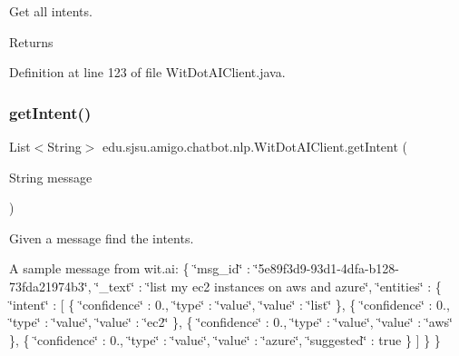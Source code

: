 Get all intents.

\begin{DoxyReturn}{Returns}

\end{DoxyReturn}


Definition at line 123 of file Wit\+Dot\+A\+I\+Client.\+java.

\mbox{\label{classedu_1_1sjsu_1_1amigo_1_1chatbot_1_1nlp_1_1_wit_dot_a_i_client_aa0e6e4f924089e29165ec44f7b7f54ee}} 
\subsubsection{\texorpdfstring{get\+Intent()}{getIntent()}}
{\footnotesize\ttfamily List$<$String$>$ edu.\+sjsu.\+amigo.\+chatbot.\+nlp.\+Wit\+Dot\+A\+I\+Client.\+get\+Intent (\begin{DoxyParamCaption}\item[{String}]{message }\end{DoxyParamCaption})}

Given a message find the intents.

A sample message from wit.\+ai\+: \{ \char`\"{}msg\+\_\+id\char`\"{} \+: \char`\"{}5e89f3d9-\/93d1-\/4dfa-\/b128-\/73fda21974b3\char`\"{}, \char`\"{}\+\_\+text\char`\"{} \+: \char`\"{}list my ec2 instances on aws and azure\char`\"{}, \char`\"{}entities\char`\"{} \+: \{ \char`\"{}intent\char`\"{} \+: \mbox{[} \{ \char`\"{}confidence\char`\"{} \+: 0., \char`\"{}type\char`\"{} \+: \char`\"{}value\char`\"{}, \char`\"{}value\char`\"{} \+: \char`\"{}list\char`\"{} \}, \{ \char`\"{}confidence\char`\"{} \+: 0., \char`\"{}type\char`\"{} \+: \char`\"{}value\char`\"{}, \char`\"{}value\char`\"{} \+: \char`\"{}ec2\char`\"{} \}, \{ \char`\"{}confidence\char`\"{} \+: 0., \char`\"{}type\char`\"{} \+: \char`\"{}value\char`\"{}, \char`\"{}value\char`\"{} \+: \char`\"{}aws\char`\"{} \}, \{ \char`\"{}confidence\char`\"{} \+: 0., \char`\"{}type\char`\"{} \+: \char`\"{}value\char`\"{}, \char`\"{}value\char`\"{} \+: \char`\"{}azure\char`\"{}, \char`\"{}suggested\char`\"{} \+: true \} \mbox{]} \} \}


